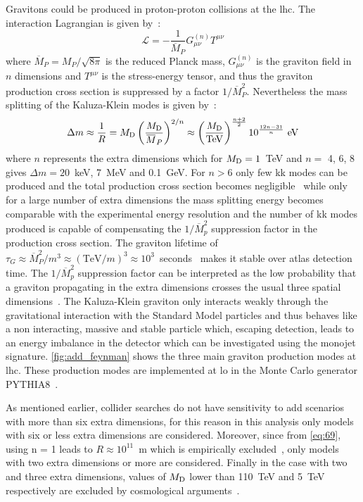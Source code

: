 Gravitons could be produced in proton-proton collisions at the \gls{lhc}. The
interaction Lagrangian is given by~\cite{ADDPhenomenology}:
\begin{equation}
  \label{eq:114}
  \mathcal{L} = - \frac{1}{\overbar{M}_P} G^{(n)}_{\mu\nu} T^{\mu\nu}
\end{equation}
where $\overbar{M}_P = M_P/\sqrt{8 \pi}$ is the reduced Planck mass,
$G^{(n)}_{\mu\nu}$ is the graviton field in $n$ dimensions and $T^{\mu\nu}$ is
the stress-energy tensor, and thus the graviton production cross section is
suppressed by a factor $1/\overbar{M}^2_P$. Nevertheless the mass splitting of
the Kaluza-Klein modes is given by~\cite{ADDPhenomenology}:
\begin{equation}
  \label{eq:115}
  \Delta m \approx \frac{1}{R} = \md \left( \frac{\md}{\overbar{M}_P}
  \right)^{2/n} \approx \left( \frac{\md}{\mathrm{TeV}} \right)^{\frac{n +
  2}{2}} 10^{\frac{12 n - 31}{n}}~\mathrm{eV}
\end{equation}
where $n$ represents the extra dimensions which for $M_\mathrm{D} = 1$~TeV and $n =$ 4,
6, 8 gives $\Delta m = 20$~keV, 7~MeV and 0.1~GeV. For $n > 6$ only few \gls{kk}
modes can be produced and the total production cross section becomes
negligible~\cite{ADDPhenomenology} while only for a large number of extra
dimensions the mass splitting energy becomes comparable with the experimental
energy resolution and the number of \gls{kk} modes produced is capable of
compensating the $1/\overbar{M}^2_p$ suppression factor in the production cross
section. The graviton lifetime of
$\tau_G \approx \overbar{M}^2_P/m^3 \approx (\mathrm{TeV}/m)^3 \approx
10^3$~seconds~\cite{ADDPhenomenology} makes it stable over \gls{atlas} detection
time. The $1/\overbar{M}^2_p$ suppression factor can be interpreted as the low
probability that a graviton propagating in the extra dimensions crosses the
usual three spatial dimensions~\cite{ADDPhenomenology}. The Kaluza-Klein
graviton only interacts weakly through the gravitational interaction with the
Standard Model particles and thus behaves like a non interacting, massive and
stable particle which, escaping detection, leads to an energy imbalance in the
detector which can be investigated using the monojet
signature. \cref{fig:add_feynman} shows the three main graviton production modes
at \gls{lhc}. These production modes are implemented at \gls{lo} in the Monte
Carlo generator PYTHIA8~\cite{PYTHIA8}.

As mentioned earlier, collider searches do not have sensitivity to \gls{add}
scenarios with more than six extra dimensions, for this reason in this analysis
only models with six or less extra dimensions are considered. Moreover, since
from \cref{eq:69}, using n = 1 leads to $R \approx 10^{11}$~m which is
empirically excluded~\cite{ADDPhenomenology}, only models with two extra
dimensions or more are considered. Finally in the case with two and three extra
dimensions, values of $M_\mathrm{D}$ lower than 110~TeV and 5~TeV respectively are
excluded by cosmological arguments~\cite{ADDCosmology}.


